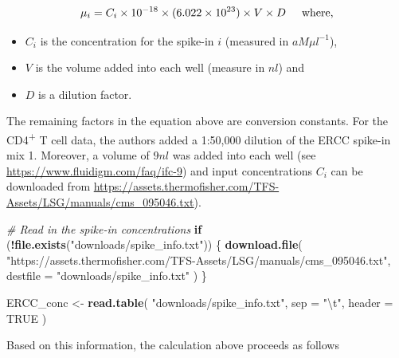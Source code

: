 \documentclass[9pt,a4paper,]{extarticle}
\newenvironment{Shaded}{\begin{snugshade}}{\end{snugshade}}
\newcommand{\CharTok}[1]{\textcolor[rgb]{0.31,0.60,0.02}{#1}}
\newcommand{\CommentTok}[1]{\textcolor[rgb]{0.56,0.35,0.01}{\textit{#1}}}
\newcommand{\ControlFlowTok}[1]{\textcolor[rgb]{0.13,0.29,0.53}{\textbf{#1}}}
\newcommand{\DataTypeTok}[1]{\textcolor[rgb]{0.13,0.29,0.53}{#1}}
\newcommand{\KeywordTok}[1]{\textcolor[rgb]{0.13,0.29,0.53}{\textbf{#1}}}
\newcommand{\NormalTok}[1]{#1}
\newcommand{\OperatorTok}[1]{\textcolor[rgb]{0.81,0.36,0.00}{\textbf{#1}}}
\newcommand{\OtherTok}[1]{\textcolor[rgb]{0.56,0.35,0.01}{#1}}
\newcommand{\StringTok}[1]{\textcolor[rgb]{0.31,0.60,0.02}{#1}}
\begin{document}
\[ \mu_{i} = C_i \times 10^{-18} \times (6.022 \times 10^{23}) 
\times V \times D \hspace{0.5cm} \mbox{where,} \]

\begin{itemize}
\item
  \(C_i\) is the concentration for the spike-in \(i\) (measured in \(aM\mu{}l^{-1}\)),
\item
  \(V\) is the volume added into each well (measure in \(nl\)) and
\item
  \(D\) is a dilution factor.
\end{itemize}

The remaining factors in the equation above are conversion constants.
For the CD4\textsuperscript{+} T cell data, the authors added a 1:50,000 dilution of the ERCC spike-in mix 1. Moreover, a volume of \(9nl\) was added into each well (see \url{https://www.fluidigm.com/faq/ifc-9})
and input concentrations \(C_i\) can be downloaded from \url{https://assets.thermofisher.com/TFS-Assets/LSG/manuals/cms_095046.txt}).

\begin{Shaded}
\begin{Highlighting}[]
\CommentTok{# Read in the spike-in concentrations}
\ControlFlowTok{if}\NormalTok{ (}\OperatorTok{!}\KeywordTok{file.exists}\NormalTok{(}\StringTok{"downloads/spike_info.txt"}\NormalTok{)) \{}
  \KeywordTok{download.file}\NormalTok{(}
    \StringTok{"https://assets.thermofisher.com/TFS-Assets/LSG/manuals/cms_095046.txt"}\NormalTok{,}
    \DataTypeTok{destfile =} \StringTok{"downloads/spike_info.txt"}
\NormalTok{  )  }
\NormalTok{\}}

\NormalTok{ERCC_conc <-}\StringTok{ }\KeywordTok{read.table}\NormalTok{(}
  \StringTok{"downloads/spike_info.txt"}\NormalTok{,}
  \DataTypeTok{sep =} \StringTok{"}\CharTok{\textbackslash{}t}\StringTok{"}\NormalTok{, }\DataTypeTok{header =} \OtherTok{TRUE}
\NormalTok{)}
\end{Highlighting}
\end{Shaded}

Based on this information, the calculation above proceeds as follows
\end{document}
